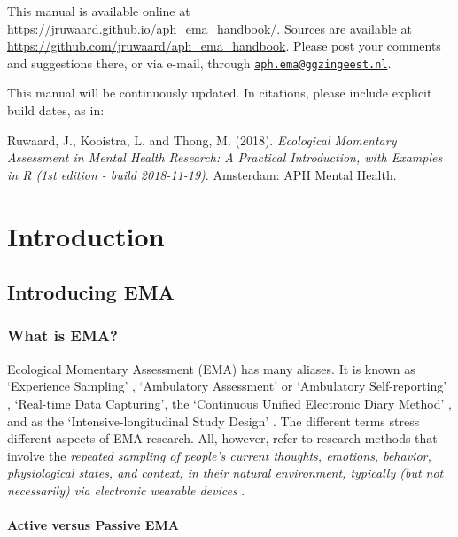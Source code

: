 \documentclass[]{book}
\begin{document}
This manual is available online at
\url{https://jruwaard.github.io/aph_ema_handbook/}. Sources are
available at \url{https://github.com/jruwaard/aph_ema_handbook}. Please
post your comments and suggestions there, or via e-mail, through
\href{mailto:aph.ema@ggzingeest.nl}{\nolinkurl{aph.ema@ggzingeest.nl}}.

This manual will be continuously updated. In citations, please include
explicit build dates, as in:

Ruwaard, J., Kooistra, L. and Thong, M. (2018). \emph{Ecological
Momentary Assessment in Mental Health Research: A Practical
Introduction, with Examples in R (1st edition - build 2018-11-19)}.
Amsterdam: APH Mental Health.

\mainmatter

\part{Introduction}\label{part-introduction}

\chapter{Introducing EMA}\label{introduction}

\section{What is EMA?}\label{what-is-ema}

  
 

Ecological Momentary Assessment (EMA) has many aliases. It is known as
`Experience Sampling' \citep{Larson1983}, `Ambulatory Assessment'
\citep{EbnerPriemer2009} or `Ambulatory Self-reporting'
\citep{Conner2012a}, `Real-time Data Capturing', the `Continuous Unified
Electronic Diary Method' \citep{EllisDavies2012}, and as the
`Intensive-longitudinal Study Design' \citep{Bolger2013}. The different
terms stress different aspects of EMA research. All, however, refer to
research methods that involve the \emph{repeated sampling of people's
current thoughts, emotions, behavior, physiological states, and context,
in their natural environment, typically (but not necessarily) via
electronic wearable devices} \citep{Shiffman2008}.

\subsection{Active versus Passive EMA}\label{active-versus-passive-ema}
\end{document}
